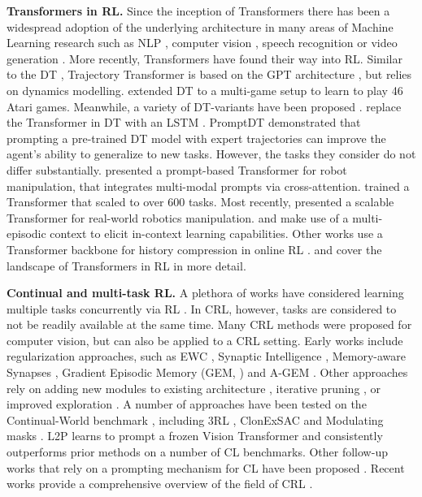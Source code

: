 \documentclass{article}
\begin{document}
\textbf{Transformers in RL.} Since the inception of Transformers \citep{Vaswani:17} there has been a widespread adoption of the underlying architecture in many areas of Machine Learning research such as NLP \citep{Devlin:18,Radford:19,Brown:20}, computer vision \citep{Dosovitskiy:21,He:22,Radford:21,Fürst:21,Ramesh:21,Rombach:22}, speech recognition \citep{Radford:22,Baevski:20} or video generation \citep{Ho:22,Singer:22}. 
More recently, Transformers have found their way into RL. 
Similar to the DT \citet{Chen:21}, Trajectory Transformer \citep{Janner:21} is based on the GPT architecture \citep{Radford:18}, but relies on dynamics modelling. \citet{Lee:22} extended DT to a multi-game setup to learn to play 46 Atari games.
Meanwhile, a variety of DT-variants have been proposed \citep{Zheng:22,Wang_bootstrapped:22,Shang:22,Meng:21}. \citet{Siebenborn:22} replace the Transformer in DT with an LSTM \citep{Hochreiter:97}. 
PromptDT \citep{Xu:22} demonstrated that prompting a pre-trained DT model with expert trajectories can improve the agent's ability to generalize to new tasks. 
However, the tasks they consider do not differ substantially. 
\citet{Jiang:22} presented a prompt-based Transformer for robot manipulation, that integrates multi-modal prompts via cross-attention. 
\citet{Reed:22} trained a Transformer that scaled to over 600 tasks. 
Most recently, \citet{Brohan:22} presented a scalable Transformer for real-world robotics manipulation.
\citet{Laskin:22} and \citet{Liu:23} make use of a multi-episodic context to elicit in-context learning capabilities.
Other works use a Transformer backbone for history compression in online RL \citep{Parisotto:20,Paischer:22,Paischer:23}.
\citet{Li:23} and \citet{Yang:23} cover the landscape of Transformers in RL in more detail.

\textbf{Continual and multi-task RL.}
A plethora of works have considered learning multiple tasks concurrently via RL \citep{Tanaka:03,Rusu:policy:16,Borsa:16,Rajeswaran:17,Bsat:17,Andreas:17,Deramo:20,Yu:20,Igl:20,Sodhani:21}.
In CRL, however, tasks are considered to not be readily available at the same time.
Many CRL methods were proposed for computer vision, but can also be applied to a CRL setting. 
Early works include regularization approaches, such as EWC \citep{Kirkpatrick:17}, Synaptic Intelligence \citep{Zenke:17}, Memory-aware Synapses \citep{Aljundi:18}, Gradient Episodic Memory (GEM, \citealp{Lopez:17}) and A-GEM \citep{Chaudhry:18}. 
Other approaches rely on adding new modules to existing architecture \citep{Rusu:16}, iterative pruning \citep{Mallya:18}, or improved exploration \citep{Steinparz:22}. 
A number of approaches have been tested on the Continual-World benchmark \citep{Wolczyk:21}, including 3RL \citep{Caccia:22}, ClonExSAC \citep{Wolczyk:22} and Modulating masks \citep{Ben:22}. 
L2P \citep{Wang:22} learns to prompt a frozen Vision Transformer \citep{Dosovitskiy:21} and consistently outperforms prior methods on a number of CL benchmarks. 
Other follow-up works that rely on a prompting mechanism for CL have been proposed \citep{Wang_dual:22, Smith:22, Razdaibiedina:23}. 
Recent works provide a comprehensive overview of the field of CRL \citep{Hadsell:20,Lesort:20,Khetarpal:22,Baker:23}. 
\end{document}
